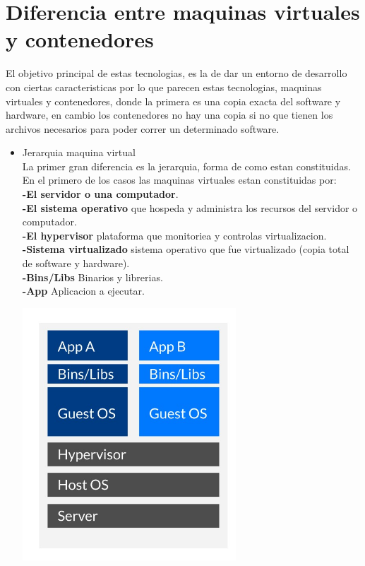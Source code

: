 \section{Diferencia entre maquinas virtuales y contenedores} 
El objetivo principal de estas tecnologias, es la de dar un entorno de desarrollo con ciertas caracteristicas por lo que parecen estas tecnologias, maquinas virtuales y contenedores, donde la primera es una copia exacta del software y hardware, en cambio los contenedores no hay una copia si no que tienen los archivos necesarios para poder correr un determinado software.

\begin{itemize}
	\item Jerarquia maquina virtual
	\\La primer gran diferencia es la jerarquia, forma de como estan constituidas. En el primero de los casos las maquinas virtuales estan constituidas por:
	\\ \textbf{-El servidor o una computador}.
	\\ \textbf{-El sistema operativo} que hospeda y administra los recursos del servidor o computador.
	\\ \textbf{-El hypervisor} plataforma que monitoriea y controlas virtualizacion.
	\\ \textbf{-Sistema virtualizado} sistema operativo que fue virtualizado (copia total de software y hardware).
	\\ \textbf{-Bins/Libs} Binarios y librerias.
	\\ \textbf{-App} Aplicacion a ejecutar.
	\begin{center}
	\includegraphics[width=8cm]{./Imagenes/jerarquia1} 
	\end{center}

\end{itemize} 


